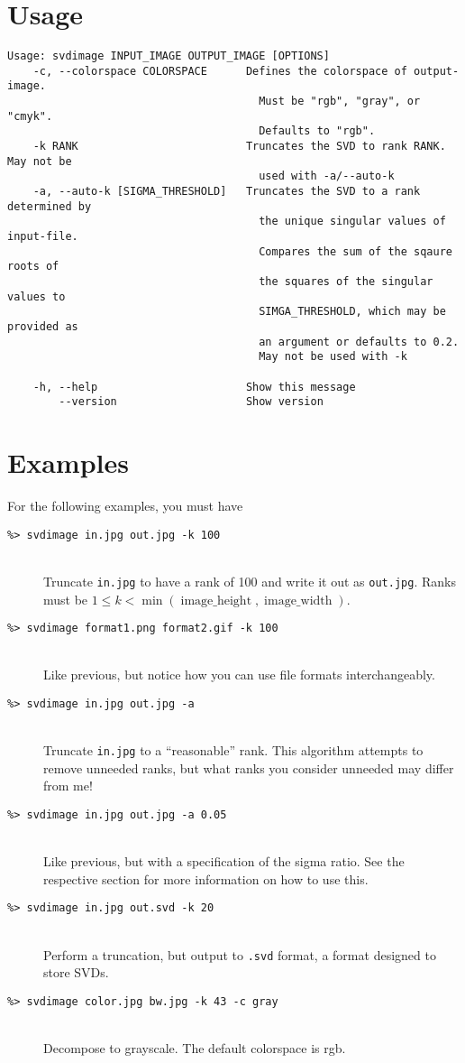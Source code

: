 \documentclass[12pt,letterpaper]{article}
\newcommand{\codeitem}[2]{\item[\texttt{\%> #1}] \hfill \\ #2}
\begin{document}
\section{Usage}
\footnotesize
\begin{verbatim}
Usage: svdimage INPUT_IMAGE OUTPUT_IMAGE [OPTIONS]
    -c, --colorspace COLORSPACE      Defines the colorspace of output-image.
                                       Must be "rgb", "gray", or "cmyk".
                                       Defaults to "rgb".
    -k RANK                          Truncates the SVD to rank RANK. May not be
                                       used with -a/--auto-k
    -a, --auto-k [SIGMA_THRESHOLD]   Truncates the SVD to a rank determined by
                                       the unique singular values of input-file.
                                       Compares the sum of the sqaure roots of
                                       the squares of the singular values to
                                       SIMGA_THRESHOLD, which may be provided as
                                       an argument or defaults to 0.2.
                                       May not be used with -k

    -h, --help                       Show this message
        --version                    Show version
\end{verbatim}
\normalsize

\section{Examples}
For the following examples, you must have 
\begin{description}
\codeitem{svdimage in.jpg out.jpg -k 100}{Truncate \texttt{in.jpg} to have a rank of 100 and write it out as \texttt{out.jpg}. Ranks must be $1 \leq k < \min(\operatorname{image\_height}, \operatorname{image\_width})$.}
\codeitem{svdimage format1.png format2.gif -k 100}{Like previous, but notice how you can use file formats interchangeably.}
\codeitem{svdimage in.jpg out.jpg -a}{Truncate \texttt{in.jpg} to a ``reasonable'' rank. This algorithm attempts to remove unneeded ranks, but what ranks you consider unneeded may differ from me!}
\codeitem{svdimage in.jpg out.jpg -a 0.05}{Like previous, but with a specification of the sigma ratio. See the respective section for more information on how to use this.}
\codeitem{svdimage in.jpg out.svd -k 20}{Perform a truncation, but output to \texttt{.svd} format, a format designed to store SVDs.}
\codeitem{svdimage color.jpg bw.jpg -k 43 -c gray}{Decompose to grayscale. The default colorspace is rgb.}
\end{description}
\end{document}
